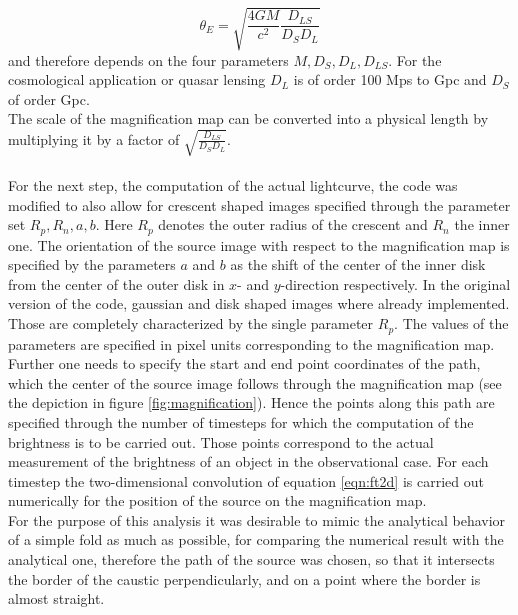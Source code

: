 \begin{equation}
\theta_{E}=\sqrt{\frac{4GM}{c^{2}} \frac{D_{LS}}{D_{S}D_{L}}} 
\end{equation}  
and therefore depends on the four parameters $M,D_{S},D_{L},D_{LS}$. For the cosmological application or quasar lensing $D_{L}$ is of order 100 Mps to Gpc and $D_{S}$ of order Gpc.\\   
The scale of the magnification map can be converted into a physical length by multiplying it by a factor of $ \sqrt{\frac{D_{LS}}{D_{S}D_{L}}}$.\\\\
For the next step, the computation of the actual lightcurve, the code was modified to also allow for crescent shaped images specified through the parameter set $R_p,R_n,a,b$. Here $R_p$ denotes the outer radius of the crescent and $R_n$ the inner one. The orientation of the source image with respect to the magnification map is specified by the parameters $a$ and $b$ as the shift of the center of the inner disk from the center of the outer disk in $x$- and $y$-direction respectively. In the original version of the code, gaussian and disk shaped images where already implemented. Those are completely characterized by the single parameter $R_p$. The values of the parameters are specified in pixel units corresponding to the magnification map. Further one needs to specify the start and end point coordinates of the path, which the center of the source image follows through the magnification map (see the depiction in figure \ref{fig:magnification}). Hence the points along this path are specified through the number of timesteps for which the computation of the brightness is to be carried out. Those points correspond to the actual measurement of the brightness of an object in the observational case. For each timestep the two-dimensional convolution of equation \ref{eqn:ft2d} is carried out numerically for the position of the source on the magnification map. \\
For the purpose of this analysis it was desirable to mimic the analytical behavior of a simple fold as much as possible, for comparing the numerical result with the analytical one, therefore the path of the source was chosen, so that it intersects the border of the caustic perpendicularly, and on a point where the border is almost straight.  
